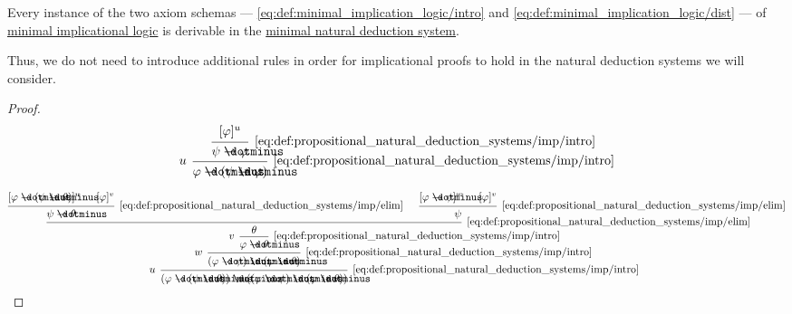 \begin{proposition}\label{thm:minimal_implicational_logic_axioms_nd_proof}
  Every instance of the two axiom schemas --- \eqref{eq:def:minimal_implication_logic/intro} and \eqref{eq:def:minimal_implication_logic/dist} --- of \hyperref[def:minimal_implication_logic]{minimal implicational logic} is derivable in the \hyperref[def:propositional_natural_deduction_systems]{minimal natural deduction system}.
\end{proposition}
\begin{comments}
  \item Thus, we do not need to introduce additional rules in order for implicational proofs to hold in the natural deduction systems we will consider.
\end{comments}
\begin{proof}
  \begin{equation*}
    \begin{prooftree}
      \hypo{ [\varphi]^u }
      \infer1[\ref{eq:def:propositional_natural_deduction_systems/imp/intro}]{ \psi \synimplies \varphi }
      \infer[left label=\( u \)]1[\ref{eq:def:propositional_natural_deduction_systems/imp/intro}]{ \varphi \synimplies (\psi \synimplies \varphi) }
    \end{prooftree}
  \end{equation*}

  \begin{equation*}
    \begin{prooftree}
      \hypo{ [\varphi \synimplies (\psi \synimplies \theta)]^u }
      \hypo{ [\varphi]^v }
      \infer2[\ref{eq:def:propositional_natural_deduction_systems/imp/elim}]{ \psi \synimplies \theta }

      \hypo{ [\varphi \synimplies \psi]^w }
      \hypo{ [\varphi]^v }
      \infer2[\ref{eq:def:propositional_natural_deduction_systems/imp/elim}]{ \psi }

      \infer2[\ref{eq:def:propositional_natural_deduction_systems/imp/elim}]{ \theta }

      \infer[left label=\( v \)]1[\ref{eq:def:propositional_natural_deduction_systems/imp/intro}]{ \varphi \synimplies \theta }
      \infer[left label=\( w \)]1[\ref{eq:def:propositional_natural_deduction_systems/imp/intro}]{ (\varphi \synimplies \psi) \synimplies (\varphi \synimplies \theta) }
      \infer[left label=\( u \)]1[\ref{eq:def:propositional_natural_deduction_systems/imp/intro}]{ (\varphi \synimplies (\psi \synimplies \theta)) \synimplies ((\varphi \synimplies \psi) \synimplies (\varphi \synimplies \theta)) }
    \end{prooftree}
  \end{equation*}
\end{proof}

